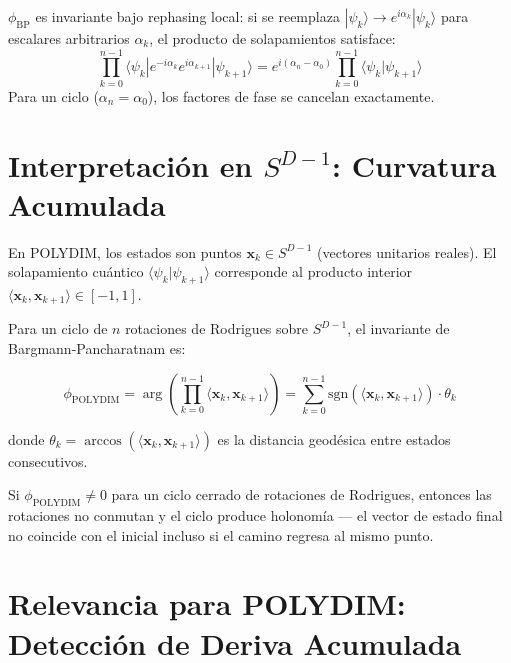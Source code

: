 \begin{theorem}
$\phi_{\text{BP}}$ es invariante bajo rephasing local: si se reemplaza
$|\psi_k\rangle \to e^{i\alpha_k}|\psi_k\rangle$ para escalares arbitrarios
$\alpha_k$, el producto de solapamientos satisface:
\begin{equation}
\prod_{k=0}^{n-1} \langle\psi_k| e^{-i\alpha_k} e^{i\alpha_{k+1}} |\psi_{k+1}\rangle = e^{i(\alpha_{n} - \alpha_0)} \prod_{k=0}^{n-1} \langle\psi_k|\psi_{k+1}\rangle
\end{equation}
Para un ciclo ($\alpha_n = \alpha_0$), los factores de fase se cancelan exactamente.
\end{theorem}

\section{Interpretación en $S^{D-1}$: Curvatura Acumulada}

En POLYDIM, los estados son puntos $\mathbf{x}_k \in S^{D-1}$ (vectores unitarios reales).
El solapamiento cuántico $\langle\psi_k|\psi_{k+1}\rangle$ corresponde al producto
interior $\langle \mathbf{x}_k, \mathbf{x}_{k+1} \rangle \in [-1, 1]$.

Para un ciclo de $n$ rotaciones de Rodrigues sobre $S^{D-1}$, el invariante de Bargmann-Pancharatnam es:

\begin{equation}
\phi_{\text{POLYDIM}} = \arg\left(\prod_{k=0}^{n-1} \langle \mathbf{x}_k, \mathbf{x}_{k+1} \rangle\right)
= \sum_{k=0}^{n-1} \text{sgn}(\langle \mathbf{x}_k, \mathbf{x}_{k+1}\rangle) \cdot \theta_k
\label{eq:bp_polydim}
\end{equation}

donde $\theta_k = \arccos(\langle \mathbf{x}_k, \mathbf{x}_{k+1}\rangle)$ es la distancia
geodésica entre estados consecutivos.

\begin{proposition}
Si $\phi_{\text{POLYDIM}} \ne 0$ para un ciclo cerrado de rotaciones de Rodrigues,
entonces las rotaciones no conmutan y el ciclo produce holonomía --- el vector
de estado final no coincide con el inicial incluso si el camino regresa al mismo punto.
\end{proposition}

\section{Relevancia para POLYDIM: Detección de Deriva Acumulada}

